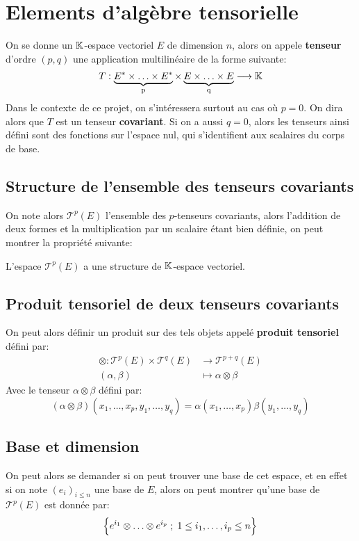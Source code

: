 \chapter{Elements d'algèbre tensorielle}
   On se donne un \(\mathbb{K}\)-espace vectoriel \(E\) de dimension \( n \), alors on appele \textbf{tenseur} d'ordre \((p, q)\) une application multilinéaire de la forme suivante:
   \begin{align*}
      T : \underbrace{E^* \times \ldots \times E^*}_\text{p} \times \underbrace{E \times \ldots \times E}_\text{q} \longrightarrow \mathbb{K}
   \end{align*}
   Dans le contexte de ce projet, on s'intéressera surtout au cas où \( p = 0 \). On dira alors que \( T \) est un tenseur \textbf{covariant}. Si on a aussi \( q = 0 \), alors les tenseurs ainsi défini sont des fonctions sur l'espace nul, qui s'identifient aux scalaires du corps de base.
   \section{Structure de l'ensemble des tenseurs covariants}
   On note alors \(\mathscr{T}^p(E)\) l'ensemble des \(p\)-tenseurs covariants, alors l'addition de deux formes et la multiplication par un scalaire étant bien définie, on peut montrer la propriété suivante:
   \begin{center}
      L'espace \( \mathscr{T}^p(E) \) a une structure de \( \mathbb{K} \)-espace vectoriel.
   \end{center}
   \section{Produit tensoriel de deux tenseurs covariants}
   On peut alors définir un produit sur des tels objets appelé \textbf{produit tensoriel} défini par:
   \begin{align*}
      \otimes : \mathscr{T}^p(E) \times \mathscr{T}^q(E) &\longrightarrow \mathscr{T}^{p+q}(E)\\
      (\alpha, \beta) &\longmapsto \alpha \otimes \beta
   \end{align*}
   Avec le tenseur \(\alpha \otimes \beta\) défini par:
   \[
      (\alpha \otimes \beta)(x_1, \ldots, x_p, y_1, \ldots, y_q) = \alpha(x_1, \ldots, x_p)\beta(y_1, \ldots, y_q)
   \]
   \section{Base et dimension}
      On peut alors se demander si on peut trouver une base de cet espace, et en effet si on note \((e_i)_{i \leq n}\) une base de \(E\), alors on peut montrer qu'une base de \(\mathcal{T}^p(E)\) est donnée par:
      \[
         \Bigl\{ e^{i_1} \otimes \ldots \otimes e^{i_p} \; ; \; 1 \leq i_1, \ldots, i_p \leq n  \Bigl\}
      \]
